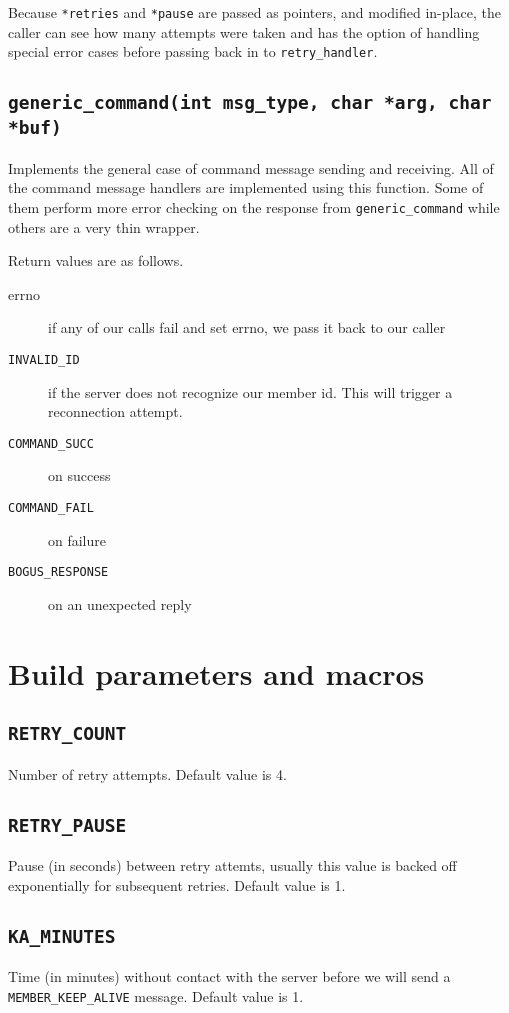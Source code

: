 \documentclass[12pt]{article}
\newcommand{\mono}[1]{\texttt{#1}}
\begin{document}
Because \mono{*retries} and \mono{*pause} are passed as pointers, and modified in-place,
the caller can see
how many attempts were taken and has the option of handling special error
cases before passing back in to \mono{retry\_handler}.

\subsection{\mono{generic\_command(int msg\_type, char *arg, char *buf)}}
Implements the general case of command message sending and receiving. All of
the command message handlers are implemented using this function. Some of
them perform more error checking on the response from \mono{generic\_command} while
others are a very thin wrapper.

Return values are as follows.
\begin{description}
    \item[errno] if any of our calls fail and set errno, we pass it back to our caller
    \item[\mono{INVALID\_ID}] if the server does not recognize our member id. This
    will trigger a reconnection attempt.
    \item[\mono{COMMAND\_SUCC}] on success
    \item[\mono{COMMAND\_FAIL}] on failure
    \item[\mono{BOGUS\_RESPONSE}] on an unexpected reply
\end{description}


\section{Build parameters and macros}
\label{sec:build}
\subsection{\mono{RETRY\_COUNT}}
Number of retry attempts. Default value is 4.
\subsection{\mono{RETRY\_PAUSE}}
Pause (in seconds) between retry attemts, usually this value is backed off
exponentially for subsequent retries. Default value is 1.
\subsection{\mono{KA\_MINUTES}}
Time (in minutes) without contact with the server before we will send a
\mono{MEMBER\_KEEP\_ALIVE} message. Default value is 1.
\end{document}
